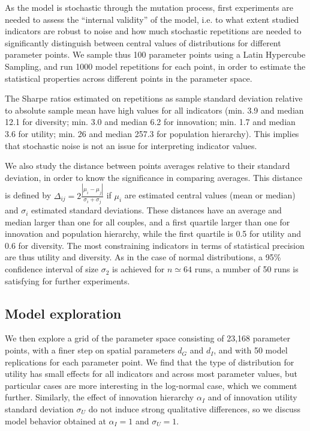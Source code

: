 \documentclass[letterpaper]{article}
\begin{document}
As the model is stochastic through the mutation process, first experiments are needed to assess the ``internal validity'' of the model, i.e. to what extent studied indicators are robust to noise and how much stochastic repetitions are needed to significantly distinguish between central values of distributions for different parameter points. We sample thus 100 parameter points using a Latin Hypercube Sampling, and run 1000 model repetitions for each point, in order to estimate the statistical properties across different points in the parameter space.

The Sharpe ratios estimated on repetitions as sample standard deviation relative to absolute sample mean have high values for all indicators (min. 3.9 and median 12.1 for diversity; min. 3.0 and median 6.2 for innovation; min. 1.7 and median 3.6 for utility; min. 26 and median 257.3 for population hierarchy). This implies that stochastic noise is not an issue for interpreting indicator values.

We also study the distance between points averages relative to their standard deviation, in order to know the significance in comparing averages. This distance is defined by $\Delta_{ij} = 2\frac{\left|\mu_i - \mu_j \right|}{\sigma_i + \sigma_j}$ if $\mu_i$ are estimated central values (mean or median) and $\sigma_i$ estimated standard deviations. These distances have an average and median larger than one for all couples, and a first quartile larger than one for innovation and population hierarchy, while the first quartile is 0.5 for utility and 0.6 for diversity. The most constraining indicators in terms of statistical precision are thus utility and diversity. 
As in the case of normal distributions, a 95\% confidence interval of size $\sigma_2$ is achieved for $n\simeq 64$ runs, a number of 50 runs is satisfying for further experiments. %


\subsection{Model exploration}

We then explore a grid of the parameter space consisting of 23,168 parameter points, with a finer step on spatial parameters $d_G$ and $d_I$, and with 50 model replications for each parameter point. We find that the type of distribution for utility has small effects for all indicators and across most parameter values, but particular cases are more interesting in the log-normal case, which we comment further. Similarly, the effect of innovation hierarchy $\alpha_I$ and of innovation utility standard deviation $\sigma_U$ do not induce strong qualitative differences, so we discuss model behavior obtained at $\alpha_I = 1$ and $\sigma_U = 1$.
\end{document}
